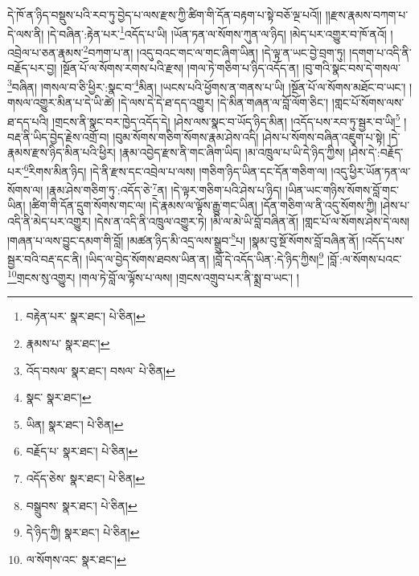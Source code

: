 དེ་ཁོ་ན་ཉིད་བསྡུས་པའི་རབ་ཏུ་བྱེད་པ་ལས་རྫས་ཀྱི་ཚིག་གི་དོན་བརྟག་པ་སྟེ་བཅོ་ལྔ་པའོ།། །།རྫས་རྣམས་བཀག་པ་དེ་ལས་ནི། །དེ་བཞིན་:རྟེན་པར་\footnote{བརྟེན་པར་  སྣར་ཐང་།  པེ་ཅིན། }འདོད་པ་ཡི། །ཡོན་ཏན་ལ་སོགས་ཀུན་ལ་ཉིད། །མེད་པར་འགྱུར་བ་ཁོ་ནའོ། །འབྲེལ་པ་ཅན་རྣམས་\footnote{རྣམས་པ་  སྣར་ཐང་། }བཀག་པ་ན། །འདུ་བའང་གང་ལ་གང་ཞིག་ཡིན། །དེ་ལྟ་ན་ཡང་བྱེ་བྲག་ཏུ། །དགག་པ་འདི་ནི་བརྗོད་པར་བྱ། །སྔོན་པོ་ལ་སོགས་རགས་པའི་རྫས། །གལ་ཏེ་གཅིག་པ་ཉིད་འདོད་ན། །བུ་གའི་སྣང་བས་དེ་གསལ་\footnote{འོད་བསལ་  སྣར་ཐང་། བསལ་  པེ་ཅིན། }བཞིན། །གསལ་བ་ཅི་ཕྱིར་:སྣང་བ་\footnote{སྣང་  སྣར་ཐང་། }མིན། །ཡངས་པའི་ཕྱོགས་ན་གནས་པ་ཡི། །སྔོན་པོ་ལ་སོགས་མཐོང་བ་ཡང་། །གསལ་འགྱུར་མིན་པ་དེ་ཡི་ཚེ། །དེ་ལས་དེ་དེ་ཐ་དད་འགྱུར། །དེ་མིན་གཞན་ལ་བློ་ལོག་ཅིང་། །གླང་པོ་སོགས་ལས་ཐ་དད་པའི། །གྲངས་ནི་སྣང་བར་ཁྱེད་འདོད་དེ། །ཤེས་ལས་སྣང་བ་ཡོད་ཉིད་མིན། །འདོད་པས་རབ་ཏུ་སྦྱར་བ་ཡི།\footnote{ཡིན།  སྣར་ཐང་།  པེ་ཅིན། } །བརྡ་ནི་ཡིད་བྱེད་རྗེས་འགྲོ་བ། །བུམ་སོགས་གཅིག་སོགས་རྣམ་ཤེས་འདི། །ཤེས་པ་སོགས་བཞིན་འཇུག་པ་སྟེ། །དེ་རྣམས་རྫས་ཉིད་མིན་པའི་ཕྱིར། །རྣམ་འབྱེད་རྫས་ནི་གང་ཞིག་ཡིད། །མ་འཁྲུལ་པ་ཡི་དེ་ཉིད་ཀྱིས། །ཤེས་དེ་:བརྗོད་པར་\footnote{བརྗོད་པ་  སྣར་ཐང་།  པེ་ཅིན། }རིགས་མིན་ཉིད། །དེ་ནི་རྫས་དང་འབྲེལ་པ་ལས། །གཅིག་ཉིད་ཡིན་དང་དོན་གཅིག་ལ། །འདུ་ཕྱིར་ཡོན་ཏན་ལ་སོགས་ལ། །རྣམ་ཤེས་གཅིག་ཏུ་:འདོད་ཅེ་\footnote{འདོད་ཅེས་  སྣར་ཐང་།  པེ་ཅིན། }ན། །དེ་ལྟར་གཅིག་པའི་ཤེས་པ་ཉིད། །ཡིན་ཡང་གཉིས་སོགས་བློ་གང་ཡིན། །ཚིག་གི་དོན་དྲུག་སོགས་གང་ལ། །དེ་རྣམས་ལ་ལྟོས་རྒྱུ་གང་ཡིན། །དོན་གཅིག་ལ་ནི་འདུ་སོགས་ཀྱི། །ཤེས་པ་འདི་ནི་མེད་པར་འགྱུར། །དེས་ན་འདི་ནི་འཁྲུལ་འགྱུར་ཏེ། །མི་ལ་མེ་ཡི་བློ་བཞིན་ནོ། །གླང་པོ་ལ་སོགས་ཤེས་དེ་ལས། །གཞན་པ་ལས་བྱུང་དམག་གི་བློ། །མཚན་ཉིད་མི་འདྲ་ལས་སྒྲུབ་\footnote{བསྒྲུབས་  སྣར་ཐང་།  པེ་ཅིན། }པ། །སྣམ་བུ་སྔོ་སོགས་བློ་བཞིན་ནོ། །འདོད་པས་སྦྱར་བའི་བརྡ་དང་ནི། །ཡིད་ལ་བྱེད་སོགས་ཐབས་ཡིན་ན། །བློ་དེ་འདོད་ཡིན་:དེ་ཉིད་ཀྱིས།\footnote{དེ་ཉིད་ཀྱི།  སྣར་ཐང་།  པེ་ཅིན། } །བློ་:ལ་སོགས་པའང་\footnote{ལ་སོགས་འང་  སྣར་ཐང་། }གྲངས་སུ་འགྱུར། །གལ་ཏེ་བློ་ལ་ལྟོས་པ་ལས། །གྲངས་འགྲུབ་པར་ནི་སྨྲ་བ་ཡང་། །

